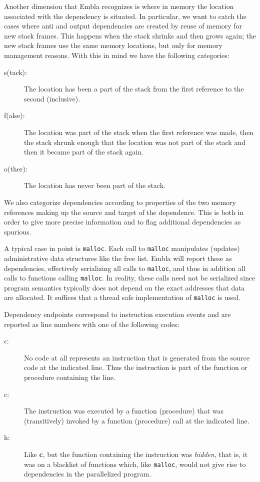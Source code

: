 Another dimension that Embla recognizes is where in memory the
location associated with the dependency is situated. In particular, we
want to catch the cases where anti and output dependencies are created
by reuse of memory for new stack frames. This happens when the stack 
shrinks and
then grows again; the new stack frames use the same memory locations,
but only for memory management reasons. With this in mind we have the
following categories:
\begin{description}
\item[s(tack):]
The location has been a part of the stack from the first reference to
the second (inclusive).
\item[f(alse):]
The location was part of the stack when the first reference was made,
then the stack shrunk enough that the location was not part of the
stack and then it became part of the stack again.
\item[o(ther):]
The location has never been part of the stack.
\end{description}

We also categorize dependencies according to properties of the two 
memory references making up the source and target of the dependence. 
This is both in order to give more precise information and to flag
additional dependencies as spurious. 

A typical case in point is 
{\tt malloc}. Each call to {\tt malloc} manipulates (updates) 
administrative data structures like the free list. Embla will
report these as dependencies, effectively serializing all calls to 
{\tt malloc}, and thus in addition all calls to functions calling
{\tt malloc}. In reality, these calls need not be serialized since
program semantics typically does not depend on the exact addresses 
that data are allocated. It suffices that a thread safe 
implementation of {\tt malloc} is used.

Dependency endpoints correspond to instruction execution events and
are reported as line numbers with one of the following codes:
\begin{description}
\item[$\epsilon$:] 
No code at all represents an instruction that is
generated from the source code at the indicated line. Thus the 
instruction is part of the function or procedure containing the 
line.
\item[c:]
The instruction was executed by a function (procedure) that was 
(transitively) invoked by a function (procedure) call at the indicated 
line.
\item[h:]
Like {\bf c}, but the function containing the instruction was 
{\em hidden}, that is, it was on a blacklist of functions which, 
like {\tt malloc}, would not give rise to dependencies in the 
parallelized program.
\end{description}


